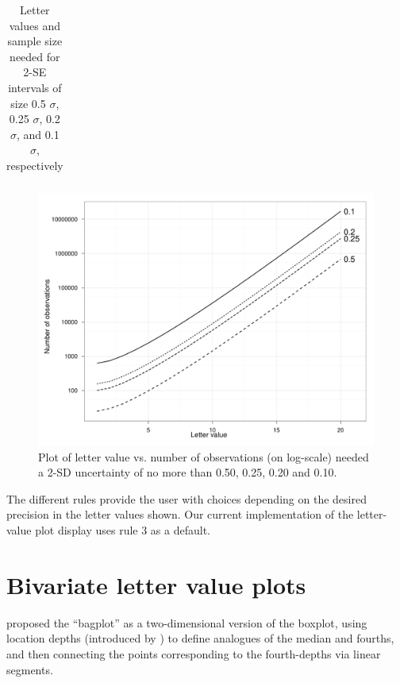 \documentclass[oneside]{article}
\begin{document}
\begin{table}
\begin{center}
\begin{tabular}{lrrrrr}
  \end{tabular}
  \end{center}
  \caption{Letter values and sample size needed for 2-SE intervals of size 0.5 $\sigma$, 0.25 $\sigma$, 0.2 $\sigma$, and 0.1 $\sigma$, respectively }
  \label{tbl:lv-error}
\end{table}

\begin{figure}[hbtp]
  \centering
  \includegraphics[width=0.5\linewidth]{letter-val-errors}

  \caption{Plot of letter value vs. number of observations (on log-scale) needed a 2-SD uncertainty of no more than 0.50, 0.25, 0.20 and 0.10. }
  \label{figyy} 
\end{figure}

The different rules provide the user with choices depending on the desired precision in the letter values shown. Our current implementation of the letter-value plot display uses rule 3 as a default.

\section{Bivariate letter value plots}
\label{sec:bivariate}

\citet{bagplots} proposed the ``bagplot'' as a two-dimensional version of the boxplot, using location depths (introduced by \citet{tukey75}) to define analogues of the median and fourths, and then connecting the points corresponding to the fourth-depths via linear segments. 
\end{document}
